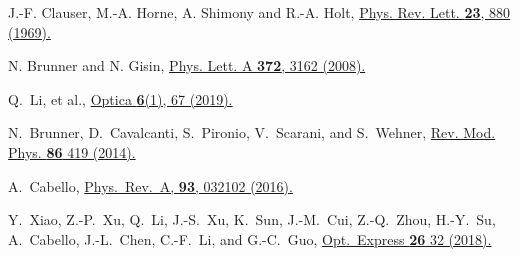 \documentclass[pra,aps,notitlepage,superscriptaddress,showpacs,showkeys]{revtex4-1}
\theoremstyle{definition}
\theoremstyle{remark}
\begin{document}
\begin{thebibliography}{99}

 J.-F. Clauser, M.-A. Horne, A. Shimony and R.-A. Holt,
 \href{https://journals.aps.org/prl/pdf/10.1103/PhysRevLett.23.880}{Phys. Rev. Lett. \textbf{23}, 880 (1969).}

 N. Brunner and N. Gisin,
 \href{http://dx.doi.org/10.1016/j.physleta.2008.01.052}{Phys. Lett. A \textbf{372}, 3162 (2008).}


 Q.~Li, et al.,
 \href{https://doi.org/10.1364/OPTICA.6.000067}{Optica \textbf{6}(1), 67 (2019).}

 N.~Brunner, D.~Cavalcanti, S.~Pironio, V.~Scarani, and S.~Wehner,
 \href{https://doi.org/10.1103/RevModPhys.86.419}{Rev. Mod. Phys. \textbf{86} 419 (2014).}


 A.~Cabello,
 \href{https://doi.org/10.1103/PhysRevA.93.032102}{Phys.~Rev.~A, \textbf{93}, 032102 (2016).}

 Y.~Xiao, Z.-P.~Xu, Q.~Li, J.-S.~Xu, K.~Sun, J.-M.~Cui, Z.-Q.~Zhou, H.-Y.~Su, A.~Cabello, J.-L.~Chen, C.-F.~Li, and G.-C.~Guo,
 \href{https://doi.org/10.1364/OE.26.000032}{Opt.~Express \textbf{26} 32 (2018).}


\end{thebibliography}
\end{document}
